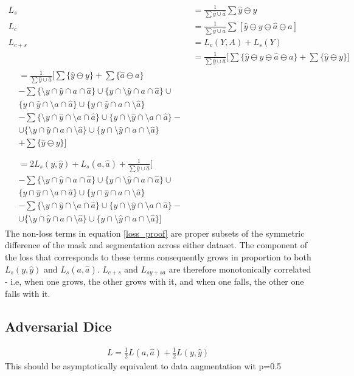 \begin{align}
L_s &= \frac{1}{\sum \hat{y} \cup \hat{a}} \sum \hat{y}\ominus y \\
L_c &= \frac{1}{\sum \hat{y} \cup \hat{a}}\sum  [\hat{y}\ominus y\ominus \hat{a} \ominus a  ]\\
L_{c+s} &= L_c(Y, A) + L_s(Y)\\
&=\frac{1}{\sum \hat{y} \cup \hat{a}} \Bigg[\sum  \{\hat{y}\ominus y\ominus \hat{a} \ominus a  \} + \sum \{\hat{y}\ominus y\}  \Bigg]\\
\begin{split}
&=\frac{1}{\sum \hat{y} \cup \hat{a}} \Bigg[\sum \{\hat{y}\ominus y\} + \sum  \{\hat{a}\ominus a\}\\
&-\sum \{\setminus y\cap \hat{y} \cap a \cap \hat{a}\}\cup\{y\cap \setminus \hat{y} \cap a \cap \hat{a}\}\cup \\ 
&\{y\cap \hat{y} \cap \setminus a \cap \hat{a}\}\cup\{y\cap \hat{y} \cap a \cap \setminus \hat{a}\}\\
&-\sum\{\setminus y\cap \hat{y} \cap \setminus a \cap \hat{a}\} \cup\{y\cap \setminus \hat{y} \cap \setminus a \cap \hat{a}\} -\\
&\cup\{\setminus y\cap \hat{y} \cap a \cap \setminus\hat{a}\}\cup\{y\cap \setminus \hat{y} \cap a \cap \setminus \hat{a}\} \\ 
&+\sum \{\hat{y}\ominus y\}   \Bigg]\\
\end{split}\\
\begin{split}
&=2L_s(y, \hat{y})+L_s(a, \hat{a}) +\frac{1}{\sum \hat{y} \cup \hat{a}} \Bigg[\\
&-\sum \{\setminus y\cap \hat{y} \cap a \cap \hat{a}\}\cup\{y\cap \setminus \hat{y} \cap a \cap \hat{a}\}\cup \\ 
&\{y\cap \hat{y} \cap \setminus a \cap \hat{a}\}\cup\{y\cap \hat{y} \cap a \cap \setminus \hat{a}\}\\
&-\sum\{\setminus y\cap \hat{y} \cap \setminus a \cap \hat{a}\} \cup\{y\cap \setminus \hat{y} \cap \setminus a \cap \hat{a}\} -\\
&\cup\{\setminus y\cap \hat{y} \cap a \cap \setminus\hat{a}\}\cup\{y\cap \setminus \hat{y} \cap a \cap \setminus \hat{a}\}   \Bigg]
\end{split} \label{loss_proof}
\end{align}
The non-loss terms in equation \ref{loss_proof} are proper subsets of the symmetric difference of the mask and segmentation across either dataset. The component of the loss that corresponds to these terms consequently grows in proportion to both \(L_s(y, \hat{y})\) and \(L_s(a, \hat{a})\). \(L_{c+s}\) and \(L_{sy+sa}\) are therefore monotonically correlated - i.e, when one grows, the other grows with it, and when one falls, the other one falls with it. 

\subsection{Adversarial Dice}
\begin{align*}
L=\frac{1}{2} L(a, \hat{a}) +  \frac{1}{2} L(y, \hat{y})
\end{align*}
This should be asymptotically equivalent to data augmentation wit p=0.5